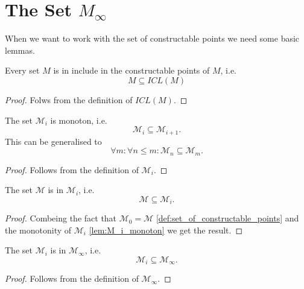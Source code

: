 \section[The set of constructable points]{The Set $M_{\infty}$}\label{set_of_constructable_points}
When we want to work with the set of constructable points we need some basic lemmas.

\begin{lemma}
    \label{lem:M_in_ICL_M}
    \leanok
    Every set $M$ is in include in the constructable points of $M$, i.e.
    \[M \subseteq ICL(M)\]
\end{lemma}
\begin{proof}
    Folws from the definition of $ICL(M)$.
\end{proof}

\begin{lemma}
    \label{lem:M_i_monoton}
    \leanok
    The set $\mathcal{M}_i$ is monoton, i.e. $$\mathcal{M}_i \subseteq \mathcal{M}_{i+1}.$$
    This can be generalised to $$\forall m :\forall n\le m : \mathcal{M}_n \subseteq \mathcal{M}_m.$$
\end{lemma}
\begin{proof}
    Follows from the definition of $\mathcal{M}_i$.
\end{proof}

\begin{lemma}
    \label{lem:M_in_Mi}
    \leanok
    The set $\mathcal{M}$ is in $\mathcal{M}_i$, i.e. $$\mathcal{M} \subseteq \mathcal{M}_i.$$
\end{lemma}
\begin{proof}
    Combeing the fact that $\mathcal{M}_0 = \mathcal{M}$ \ref{def:set_of_constructable_points} and the monotonity of $\mathcal{M}_i$ \ref{lem:M_i_monoton} we get the result.
\end{proof}

\begin{lemma}
    \label{lem:M_i_in_M_inf}
    \leanok
    The set $\mathcal{M}_i$ is in $\mathcal{M}_{\infty}$, i.e. $$\mathcal{M}_i \subseteq \mathcal{M}_{\infty}.$$
\end{lemma}
\begin{proof}
    Follows from the definition of $\mathcal{M}_{\infty}$.
\end{proof}

